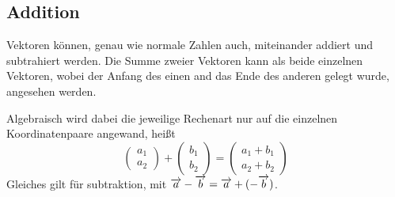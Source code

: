 \documentclass{article}
\begin{document}
\subsection{Addition} 
Vektoren können, genau wie normale Zahlen auch, miteinander addiert und subtrahiert werden. Die Summe zweier Vektoren kann als beide einzelnen Vektoren, wobei der Anfang des einen and das Ende des anderen gelegt wurde, angesehen werden. \newline
 
\noindent \begin{minipage}{4cm}
  \centering
\end{minipage}
\hfill
\begin{minipage}{\dimexpr\textwidth-4cm}
Algebraisch wird dabei die jeweilige Rechenart nur auf die einzelnen Koordinatenpaare angewand, heißt 
\[ 
 \begin{pmatrix} a_1 \\ a_2 \end{pmatrix} +
 \begin{pmatrix} b_1 \\ b_2 \end{pmatrix} =
 \begin{pmatrix} a_1 + b_1 \\ a_2 + b_2 \end{pmatrix} 
\]
Gleiches gilt für subtraktion, mit $\overrightarrow{a} - \overrightarrow{b} = \overrightarrow{a} + (-\overrightarrow{b})$.
\end{minipage} 
 
\end{document}
